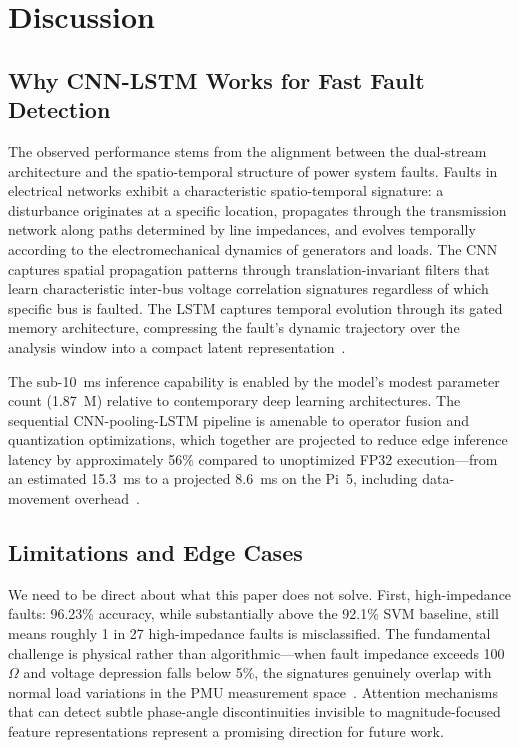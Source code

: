 \documentclass[journal]{IEEEtran}
\begin{document}
\section{Discussion}
\label{sec:discussion}

\subsection{Why CNN-LSTM Works for Fast Fault Detection}

The observed performance stems from the alignment between the dual-stream architecture and the spatio-temporal structure of power system faults. Faults in electrical networks exhibit a characteristic spatio-temporal signature: a disturbance originates at a specific location, propagates through the transmission network along paths determined by line impedances, and evolves temporally according to the electromechanical dynamics of generators and loads. The CNN captures spatial propagation patterns through translation-invariant filters that learn characteristic inter-bus voltage correlation signatures regardless of which specific bus is faulted. The LSTM captures temporal evolution through its gated memory architecture, compressing the fault's dynamic trajectory over the analysis window into a compact latent representation~\cite{ref11,ref26}.

The sub-10~ms inference capability is enabled by the model's modest parameter count (1.87~M) relative to contemporary deep learning architectures. The sequential CNN-pooling-LSTM pipeline is amenable to operator fusion and quantization optimizations, which together are projected to reduce edge inference latency by approximately 56\% compared to unoptimized FP32 execution---from an estimated 15.3~ms to a projected 8.6~ms on the Pi~5, including data-movement overhead~\cite{ref30}.

\subsection{Limitations and Edge Cases}

We need to be direct about what this paper does not solve. First, high-impedance faults: 96.23\% accuracy, while substantially above the 92.1\% SVM baseline, still means roughly 1 in 27 high-impedance faults is misclassified. The fundamental challenge is physical rather than algorithmic---when fault impedance exceeds 100~$\Omega$ and voltage depression falls below 5\%, the signatures genuinely overlap with normal load variations in the PMU measurement space~\cite{ref18}. Attention mechanisms that can detect subtle phase-angle discontinuities invisible to magnitude-focused feature representations represent a promising direction for future work.
\end{document}
